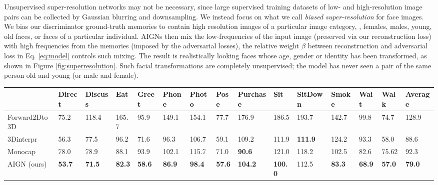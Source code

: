 \documentclass[10pt,twocolumn,letterpaper]{article}
\begin{document}
\begin{bibunit}[ieee]
Unsupervised super-resolution networks \cite{sonderby2014apparent} may not be necessary, since  large supervised training datasets of low- and high-resolution image pairs can be collected by Gaussian blurring and downsampling.   
We instead focus on what we call \textit{biased super-resolution} for face images. We  bias our discriminator ground-truth memories to contain high resolution images of a particular image category, \eg, females, males, young, old faces, or faces of a particular individual. AIGNs  then mix the low-frequencies of the input image (preserved via our reconstruction loss) with high frequencies from the memories (imposed by the adversarial losses), the relative weight $\beta$ between reconstruction and adversarial loss in Eq. \ref{eq:model} controls such mixing.  The result is realistically looking  faces whose age, gender or identity has been  transformed, as shown in Figure  \ref{fig:superresolution}. 
Such facial transformations are completely unsupervised; the model has never seen a pair of the same person old and young (or male and female). %
\centering
\begin{tabular}{K{0.12\textwidth}K{0.04\textwidth}K{0.04\textwidth}K{0.03\textwidth}K{0.03\textwidth}K{0.03\textwidth}K{0.04\textwidth}K{0.03\textwidth}K{0.05\textwidth}K{0.04\textwidth}K{0.05\textwidth}K{0.04\textwidth}K{0.03\textwidth}K{0.03\textwidth}K{0.05\textwidth}}
 \hline
  & Direct & Discuss & Eat & Greet & Phone & Photo & Pose & Purchase & Sit & SitDown & Smoke & Wait& Walk &  Average\\
 \hline
  Forward2Dto3D & 75.2 & 118.4 & 165.7 & 95.9 & 149.1 & 154.1 & 77.7 & 176.9 & 186.5 & 193.7 & 142.7 & 99.8 &  74.7 &  128.9\\
  3Dinterpr \cite{Wu2016} & 56.3 & 77.5 & 96.2 & 71.6 & 96.3 & 106.7 & 59.1 & 109.2 &111.9 & {\bf 111.9} & 124.2 & 93.3 & 58.0  & 88.6 \\
    Monocap \cite{DBLP:journals/corr/ZhouZPLDD17}&  78.0 & 78.9 & 88.1 & 93.9 & 102.1 & 115.7 & 71.0 & {\bf 90.6} &  121.0 & 118.2 & 102.5 & 82.6 &  75.62 &  92.3  \\
  AIGN (ours)  & {\bf 53.7} & {\bf 71.5} & {\bf 82.3} & {\bf 58.6} & {\bf 86.9} & {\bf 98.4} & {\bf 57.6} & {\bf 104.2} & {\bf 100.0} & 112.5 & {\bf 83.3} & {\bf 68.9} & {\bf 57.0} &  {\bf 79.0} \\

\end{tabular}
\end{bibunit}
\end{document}
